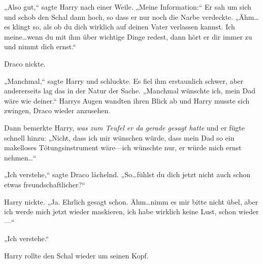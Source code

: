 „Also gut,“ sagte Harry nach einer Weile. „Meine Information:“ Er sah um sich und schob den Schal dann hoch, so dass er nur noch die Narbe verdeckte. „Ähm…es klingt so, als ob du dich wirklich auf deinen Vater verlassen kannst. Ich meine…wenn du mit ihm über wichtige Dinge redest, dann hört er dir immer zu und nimmt dich ernst.“

Draco nickte.

„Manchmal,“ sagte Harry und schluckte. Es fiel ihm erstaunlich schwer, aber andererseits lag das in der Natur der Sache. „Manchmal wünschte ich, mein Dad wäre wie deiner.“ Harrys Augen wandten ihren Blick ab und Harry musste sich zwingen, Draco wieder anzusehen.

Dann bemerkte Harry, \emph{was zum Teufel er da gerade gesagt hatte} und er fügte schnell hinzu: „Nicht, dass ich mir wünschen würde, dass mein Dad so ein makelloses Tötungsinstrument wäre—ich wünschte nur, er würde mich ernst nehmen…“

„Ich verstehe,“ sagte Draco lächelnd. „So…fühlst du dich jetzt nicht auch schon etwas freundschaftlicher?“

Harry nickte. „Ja. Ehrlich gesagt schon. Ähm…nimm es mir bitte nicht übel, aber ich werde mich jetzt wieder maskieren, ich habe wirklich keine Lust, schon wieder—“

„Ich verstehe.“

Harry rollte den Schal wieder um seinen Kopf.

